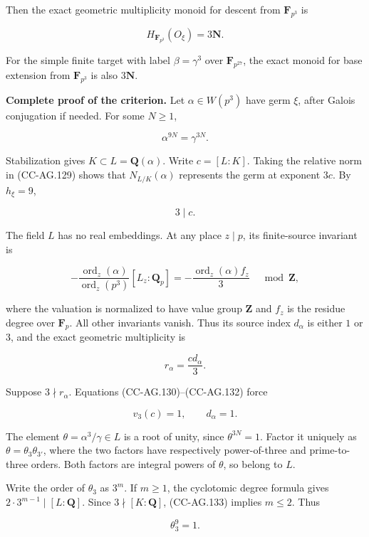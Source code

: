Then the exact geometric multiplicity monoid for descent from
\(\mathbf F_{p^3}\) is

\[
 H_{\mathbf F_{p^3}}(O_\xi)=3\mathbf N.
 \tag{CC-AG.128}
\]

For the simple finite target with label \(\beta=\gamma^3\) over
\(\mathbf F_{p^{27}}\), the exact monoid for base extension from
\(\mathbf F_{p^3}\) is also \(3\mathbf N\).

\textbf{Complete proof of the criterion.} Let \(\alpha\in W(p^3)\) have
germ \(\xi\), after Galois conjugation if needed. For some \(N\ge1\),

\[
 \alpha^{9N}=\gamma^{3N}.
 \tag{CC-AG.129}
\]

Stabilization gives \(K\subset L=\mathbf Q(\alpha)\). Write \(c=[L:K]\).
Taking the relative norm in (CC-AG.129) shows that \(N_{L/K}(\alpha)\)
represents the germ at exponent \(3c\). By \(h_\xi=9\),

\[
 3\mid c.
 \tag{CC-AG.130}
\]

The field \(L\) has no real embeddings. At any place \(z\mid p\), its
finite-source invariant is

\[
 -\frac{\operatorname{ord}_z(\alpha)}
           {\operatorname{ord}_z(p^3)}[L_z:\mathbf Q_p]
 =-\frac{\operatorname{ord}_z(\alpha)f_z}{3}
                                      \quad\bmod\mathbf Z,
 \tag{CC-AG.131}
\]

where the valuation is normalized to have value group \(\mathbf Z\) and
\(f_z\) is the residue degree over \(\mathbf F_p\). All other invariants
vanish. Thus its source index \(d_\alpha\) is either \(1\) or \(3\), and
the exact geometric multiplicity is

\[
 r_\alpha=\frac{c d_\alpha}{3}.
 \tag{CC-AG.132}
\]

Suppose \(3\nmid r_\alpha\). Equations (CC-AG.130)--(CC-AG.132) force

\[
 v_3(c)=1,\qquad d_\alpha=1.
 \tag{CC-AG.133}
\]

The element \(\theta=\alpha^3/\gamma\in L\) is a root of unity, since
\(\theta^{3N}=1\). Factor it uniquely as \(\theta=\theta_3\theta_{3'}\),
where the two factors have respectively power-of-three and
prime-to-three orders. Both factors are integral powers of \(\theta\),
so belong to \(L\).

Write the order of \(\theta_3\) as \(3^m\). If \(m\ge1\), the cyclotomic
degree formula gives \(2\cdot3^{m-1}\mid[L:\mathbf Q]\). Since
\(3\nmid[K:\mathbf Q]\), (CC-AG.133) implies \(m\le2\). Thus

\[
 \theta_3^9=1.
 \tag{CC-AG.134}
\]

